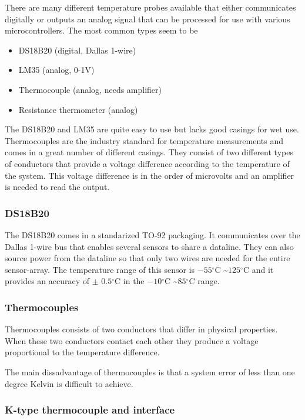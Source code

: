 \documentclass[11pt,fleqn,openany]{book} %
\newcommand{\degree}{\ensuremath{^\circ}}
\begin{document}
There are many different temperature probes available that either communicates digitally or outputs an analog signal that can be processed for use with various microcontrollers. The most common types seem to be

\begin{itemize}
\item DS18B20 (digital, Dallas 1-wire)
\item LM35 (analog, 0-1V)
\item Thermocouple (analog, needs amplifier)
\item Resistance thermometer (analog)
\end{itemize}

The DS18B20 and LM35 are quite easy to use but lacks good casings for wet use. Thermocouples are the industry standard for temperature measurements and comes in a great number of different casings. They consist of two different types of conductors that provide a voltage difference according to the temperature of the system. This voltage difference is in the order of microvolts and an amplifier is needed to read the output.

\subsubsection{DS18B20}

The DS18B20 comes in a standarized TO-92 packaging. It communicates over the Dallas 1-wire bus that enables several sensors to share a dataline. They can also source power from the dataline so that only two wires are needed for the entire sensor-array.
The temperature range of this sensor is $-55\degree$C \textasciitilde $125\degree$C and it provides an accuracy of $\pm$ $0.5\degree$C in the $-10\degree$C \textasciitilde $85\degree$C range.

\subsubsection{Thermocouples}

Thermocouples consists of two conductors that differ in physical properties. When these two conductors contact each other they produce a voltage proportional to the temperature difference.

The main dissadvantage of thermocouples is that a system error of less than one degree Kelvin is difficult to achieve.

\subsubsection{K-type thermocouple and interface}
\end{document}
